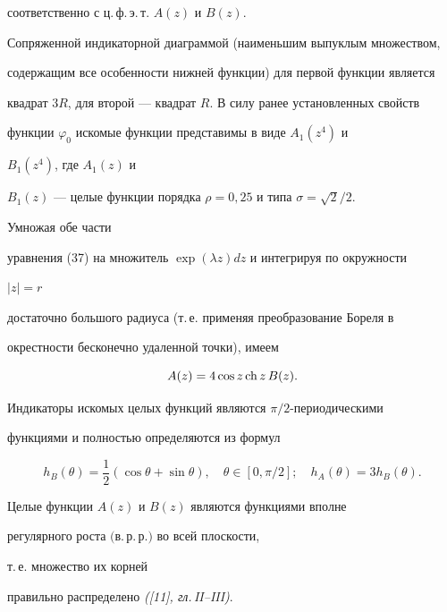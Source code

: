 соответственно с ц.\,ф.\,э.\,т. $A(z)$ и $B(z)$. 


Сопряженной индикаторной диаграммой (наименьшим выпуклым множеством, 


содержащим все особенности нижней функции) для первой функции является 


квадрат $3R$, для второй --- квадрат $R$. В силу ранее установленных свойств 


функции $\varphi_0$ искомые функции представимы в виде $A_1(z^4)$ и 


$B_1(z^4)$, где $A_1(z)$ и 


$B_1(z)$ --- целые функции порядка $\rho=0,25$ и типа $\sigma=\sqrt{2}/2$. 


Умножая обе части 


уравнения (37) на множитель $\exp(\lambda z)dz$ и интегрируя по окружности 


$|z|=r$ 


достаточно большого радиуса (т.\,е. применяя преобразование Бореля в 


окрестности бесконечно удаленной точки), имеем 


\begin{equation} 


A(z)=4\cos z\ch z\,B(z). 


\end{equation} 


Индикаторы искомых целых функций являются $\pi/2$-периодическими 


функциями и полностью определяются из формул 


$$ 


h_B(\theta)=\frac{1}{2}(\cos\theta+\sin\theta),\quad 


\theta\in[0,\pi/2];\quad h_A(\theta)=3h_B(\theta). 


$$ 


 


 


\begin{thm} 


Целые функции $A(z)$ и $B(z)$ являются функциями вполне 


регулярного роста $($в.\,р.\,р.$)$ во всей плоскости, 


т.\,е. множество их корней 


правильно распределено {\em ([11], гл.\,II--III)}. 


\end{thm} 


